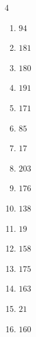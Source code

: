 \begin{multicols}{4}
\begin{enumerate}
  \item $94$


\columnbreak %

  \item $181$


  \item $180$


  \item $191$


  \item $171$


  \item $85$


  \item $17$


  \item $203$


  \item $176$


  \item $138$


  \item $19$


  \item $158$


  \item $175$


  \item $163$


  \item $21$


  \item $160$


\end{enumerate}
\end{multicols}
